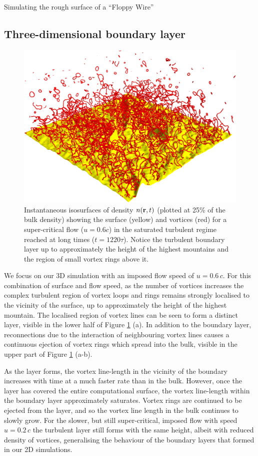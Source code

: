 \begin{chapter}{\label{cha:afm}Simulating the rough surface of a ``Floppy Wire''}
\subsection{Three-dimensional boundary layer}
\begin{figure}
\centering
{}%
\includegraphics[width=0.5\linewidth]{./afm/fig2-2b}%
\caption{Instantaneous isosurfaces of density $n({\bf r},t)$ 
(plotted at 25\%  of the bulk density) showing the surface (yellow) and vortices (red) for a super-critical flow ($u=0.6 c$) in the saturated 
turbulent regime reached at long times ($t=1220 \tau$).  Notice the turbulent boundary layer up to
approximately the height of the highest mountains and the region
of small vortex rings above it.}
\label{fig2}
\end{figure}
We focus on our 3D simulation with an imposed flow speed of $u=0.6\,c$. For this combination of surface and flow speed, as the number of vortices increases the complex turbulent region of vortex loops and rings remains strongly localised to the vicinity of the surface, up to approximately the height of the highest mountain. The localised region of vortex lines can be seen to form a distinct layer, visible in the lower half of Figure \ref{fig2} (a). In addition to the boundary layer, reconnections due to the interaction of neighbouring vortex lines causes a continuous ejection of vortex rings which spread into the bulk, visible in
the upper part of Figure \ref{fig2} (a-b).

As the layer forms, the vortex line-length in the vicinity of the boundary increases with time at a much faster rate than in the bulk. However, once the layer has covered the entire computational surface, the vortex line-length within the boundary layer approximately saturates. Vortex rings are continued to be ejected from the layer, and so the vortex line length in the bulk continues to slowly grow. For the slower, but still super-critical, imposed flow with speed $u=0.2\,c$ the turbulent layer still forms with the same height, albeit with reduced density of vortices, generalising the behaviour of the boundary layers that formed in our 2D simulations.


\end{chapter}
